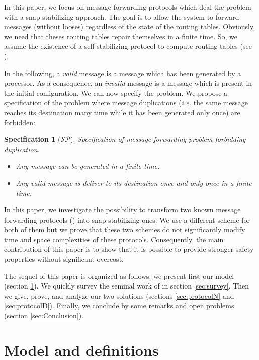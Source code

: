 \documentclass[11pt]{article}
\newtheorem{specification}{Specification}
\begin{document}
In this paper, we focus on message forwarding protocols which deal the problem with a snap-stabilizing approach. The goal is to allow the system to forward messages (without looses) regardless of the state of the routing tables. Obviously, we need that theses routing tables repair themselves in a finite time. So, we assume the existence of a self-stabilizing protocol to compute routing tables (see \cite{HC92,KK05,D97}).

In the following, a \emph{valid} message is a message which has been generated by a processor. As a consequence, an \emph{invalid} message is a message which is present in the initial configuration. We can now specify the problem. We propose a specification of the problem where message duplications (\emph{i.e.} the same message reaches its destination many time while it has been generated only once) are forbidden:

\begin{specification}[$\mathcal{SP}$]\label{specif:spe2}
Specification of message forwarding problem forbidding duplication.
\begin{itemize}
	\item Any message can be generated in a finite time.
	\item Any valid message is deliver to its destination once and only once in a finite time.
\end{itemize}
\end{specification}

In this paper, we investigate the possibility to transform two known message forwarding protocols (\cite{MS78}) into snap-stabilizing ones. We use a different scheme for both of them but we prove that these two schemes do not significantly modify time and space complexities of these protocols. Consequently, the main contribution of this paper is to show that it is possible to provide stronger safety properties without significant overcost.

The sequel of this paper is organized as follows: we present first our model (section \ref{sec:Model}). We quickly survey the seminal work of \cite{MS78} in section \ref{sec:survey}. Then we give, prove, and analyze our two solutions (sections \ref{sec:protocolN} and \ref{sec:protocolD}). Finally, we conclude by some remarks and open problems (section \ref{sec:Conclusion}).

\section{Model and definitions}\label{sec:Model}
\end{document}

